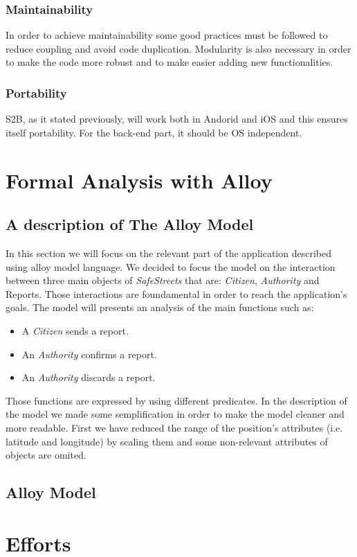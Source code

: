 \documentclass{article}
\begin{document}
\subsubsection{Maintainability}
In order to achieve maintainability some good practices must be followed to reduce coupling and avoid code duplication.
Modularity is also necessary in order to make the code more robust and to make easier adding new functionalities.

\subsubsection{Portability}
S2B, as it stated previously, will work both in Andorid and iOS and this ensures itself portability. For 
the back-end part, it should be OS independent.

\clearpage


\section{Formal Analysis with Alloy}

\subsection{A description of The Alloy Model}
In this section we will focus on the relevant part of the application described
using alloy model language. We decided to
focus the model on the interaction between three main objects of 
\textit{SafeStreets} that are: \textit{Citizen}, \textit{Authority} and Reports. 
Those interactions are foundamental in order to reach the application's goals. 
The model will presents an analysis of the main functions such as:
\begin{itemize}
    \item A \textit{Citizen} sends a report. 
    \item An \textit{Authority} confirms a report. 
    \item An \textit{Authority} discards a report.
\end{itemize}
Those functions are expressed by using different predicates. In 
the description of the model we made some semplification in order to
make the model cleaner and more readable. First we have reduced the range
of the position's attributes (i.e. latitude and longitude) by scaling them and 
some non-relevant attributes of objects are omited. 

\clearpage

\subsection{Alloy Model}



\section{Efforts}
\end{document}
